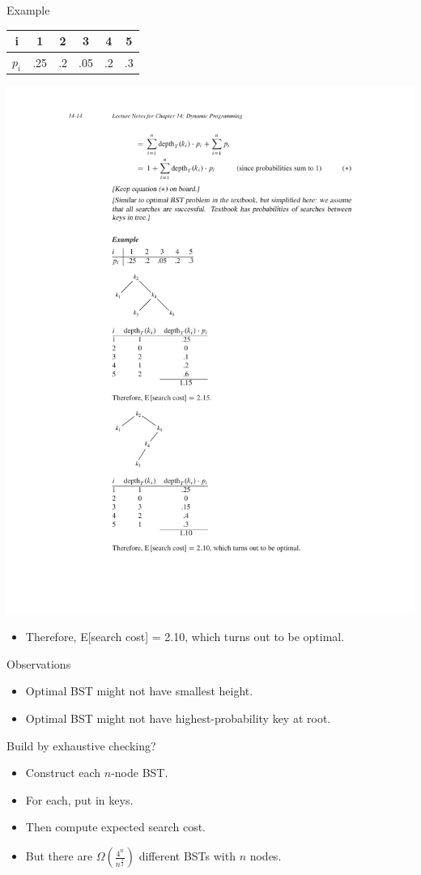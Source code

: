 \documentclass{beamer}
\begin{document}
\begin{frame}{Example}
    \centering
    \begin{tabular}{c | c c c c c}
        i & 1 & 2 & 3 & 4 & 5 \\
        \hline
        $p_i$ & .25 & .2 & .05 & .2 & .3
    \end{tabular}
    \includegraphics[width=\textwidth, trim={4cm 4cm 4cm 17cm}, clip]{figures/BST_example}
    \begin{itemize}
        \item Therefore, E[search cost] = 2.10, which turns out to be optimal.
    \end{itemize}
\end{frame}

\begin{frame}{Observations}
    \begin{itemize}
        \item Optimal BST might not have smallest height.
        \item Optimal BST might not have highest-probability key at root.
    \end{itemize}
    Build by exhaustive checking?
    \begin{itemize}
        \item Construct each $n$-node BST.
        \item For each, put in keys.
        \item Then compute expected search cost.
        \item But there are $\Omega \left( \frac{4^n}{n^{\frac{3}{2}}} \right)$ different BSTs with $n$ nodes.
    \end{itemize}
\end{frame}
\end{document}
